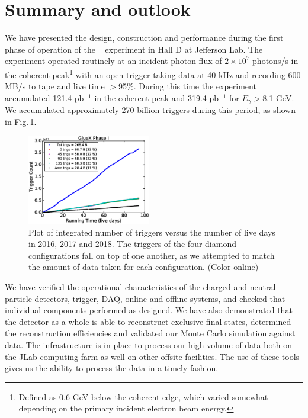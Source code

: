 
\section{Summary and outlook\label{sec:summary} }
We have presented the design, construction and performance during the first phase of operation of the  \gx~ experiment in Hall D at Jefferson Lab. 
The experiment operated routinely at an incident photon flux of $2\times 10^{7}$ photons/s in the coherent peak\footnote{Defined as 0.6 GeV below the coherent edge, which varied somewhat depending on the primary incident electron beam energy.} with an open trigger taking data
at 40 kHz and recording 600 MB/s to tape and live time $>$95\%. 
During this time the experiment accumulated  121.4 pb$^{-1}$ in the coherent peak and 319.4 pb$^{-1}$ for $E_\gamma>$8.1 GeV. We accumulated approximately 270 billion triggers during this period, as shown in Fig.\,\ref{fig:plot_rcdb3_phaseI}.  

\begin{figure}[tbh]\centering
\includegraphics[width=0.48\textwidth]{figures/plot_rcdb3_phaseI.eps}
\caption{\label{fig:plot_rcdb3_phaseI} 
Plot of integrated number of triggers versus the number of live days
in 2016, 2017 and 2018. The triggers of the four diamond configurations fall on top of one another, as we attempted to match the amount of data taken for each configuration. 
(Color online)
 }
\end{figure}   

We have verified the operational characteristics of the charged and neutral particle detectors, trigger, DAQ, online and offline systems, and checked that individual components performed as designed. We have also demonstrated that the detector as a whole is able to reconstruct exclusive final states, determined the reconstruction efficiencies and validated our Monte Carlo simulation against data. The infrastructure is in place to process our high volume of data both on the JLab computing farm as well on other offsite facilities. The use of these tools gives us the ability to process the data in a timely fashion.

